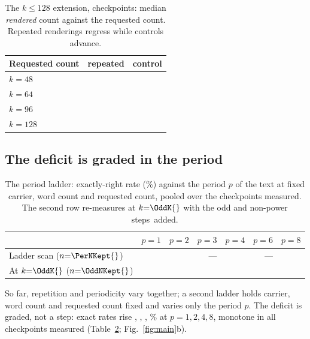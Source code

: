 \documentclass{article}
\newcommand{\tabsize}{\small}
\begin{document}
\begin{table}[t]
\centering
\caption{The $k\le128$ extension, \HzNModels{} checkpoints: median
\emph{rendered} count against the requested count. Repeated renderings
regress while controls advance.}
\label{tab:ext}
{\tabsize\setlength{\tabcolsep}{6pt}
\begin{tabular}{lrr}
\toprule
Requested count & repeated & control \\
\midrule
$k{=}48$  & \ExtRepFortyEight{} & \ExtCtlFortyEight{} \\
$k{=}64$  & \ExtRepSixtyFour{} & \ExtCtlSixtyFour{} \\
$k{=}96$  & \ExtRepNinetySix{} & \ExtCtlNinetySix{} \\
$k{=}128$ & \ExtRepOneTwoEight{} & \ExtCtlOneTwoEight{} \\
\bottomrule
\end{tabular}}
\end{table}

\subsection{The deficit is graded in the period}

\begin{table}[t]
\centering
\caption{The period ladder: exactly-right rate (\%) against the period $p$
of the text at fixed carrier, word count and requested count, pooled over
the \PerNCk{} checkpoints measured. The second row re-measures at
$k{=}\OddK{}$ with the odd and non-power steps~added.}
\label{tab:period}
{\tabsize\setlength{\tabcolsep}{4.5pt}
\begin{tabular}{lrrrrrr}
\toprule
 & $p{=}1$ & $p{=}2$ & $p{=}3$ & $p{=}4$ & $p{=}6$ & $p{=}8$ \\
\midrule
Ladder scan ($n{=}\PerNKept{}$) & \PerPOne{} & \PerPTwo{} & --- & \PerPFour{} & --- & \PerPEight{} \\
At $k{=}\OddK{}$ ($n{=}\OddNKept{}$) & \OddPOne{} & \OddPTwo{} & \OddPThree{} & \OddPFour{} & \OddPSix{} & \OddPEight{} \\
\bottomrule
\end{tabular}}
\end{table}

So far, repetition and periodicity vary together; a second ladder holds
carrier, word count and requested count fixed and varies only the period
$p$. The deficit is graded, not a step: exact rates rise
\PerPOne{}, \PerPTwo{}, \PerPFour{}, \PerPEight{}\% at $p{=}1,2,4,8$,
monotone in all \PerNCk{} checkpoints measured (Table~\ref{tab:period};
Fig.~\ref{fig:main}b).
\end{document}
